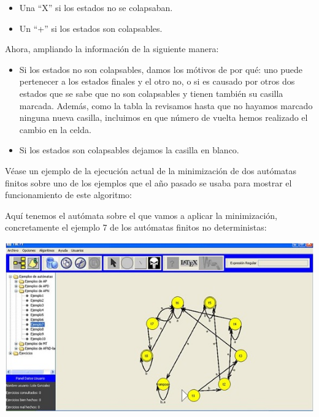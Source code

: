 \documentclass[12pt,a4paper,spanish]{book}
\begin{document}
\begin{itemize}

\item Una ``X'' si los estados no se colapsaban.

\item Un ``+'' si los estados son colapsables.

\end{itemize}

Ahora, ampliando la informaci\'on de la siguiente manera:

\begin{itemize}

\item Si los estados no son colapsables, damos los m\'otivos de por qu\'e: uno puede pertenecer a los estados finales y el otro no, o si es causado por otros dos estados que se sabe que no son colapsables y tienen tambi\'en su casilla marcada. Adem\'as, como la tabla la revisamos hasta que no hayamos marcado ninguna nueva casilla, incluimos en que n\'umero de vuelta hemos realizado el cambio en la celda.

\item Si los estados son colapsables dejamos la casilla en blanco.

\end{itemize}

V\'ease un ejemplo de la ejecuci\'on actual de la minimizaci\'on de dos aut\'omatas finitos sobre uno de los ejemplos que el a\~no pasado se usaba para mostrar el funcionamiento de este algoritmo:

Aqu\'i tenemos el aut\'omata sobre el que vamos a aplicar la minimizaci\'on, concretamente el ejemplo 7 de los aut\'omatas finitos no deterministas:\\
\begin{center}
\includegraphics[width=\textwidth]{auto1.jpg}\newline \newline \newline \newline \newline 

\end{center}
\end{document}
